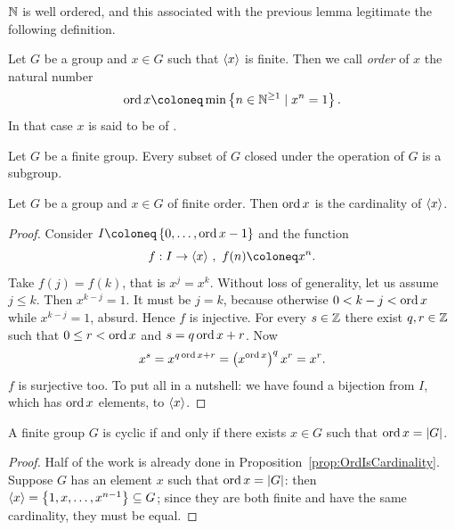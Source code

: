 \(\mathbb N\) is well ordered, and this associated with the previous lemma legitimate the following definition.

\begin{definition}
Let \(G\) be a group and \(x \in G\) such that \(\left\langle x\right\rangle\) is finite. Then we call {\em order} of \(x\) the natural number
\[\ord x \coloneq \min \set{n \in \nn^{\ge 1} \mid x^n = 1}.\]
In that case \(x\) is said to be of .
\end{definition}

\begin{exercise}
Let \(G\) be a finite group. Every subset of \(G\) closed under the operation of \(G\) is a subgroup.
\end{exercise}

\begin{proposition}\label{prop:OrdIsCardinality}
Let \(G\) be a group and \(x \in G\) of finite order. Then \(\operatorname{ord} x\) is the cardinality of \(\left\langle x\right\rangle\).
\end{proposition}

\begin{proof}
Consider \(I \coloneq \set{0, \dots{}, \ord x-1}\) and the function
\[f : I \to \gen x\,, \ f(n) \coloneq x^n.\]
Take \(f(j) = f(k)\), that is \(x^j = x^k\). Without loss of generality, let us assume \(j \le k\). Then \(x^{k-j} = 1\). It must be \(j = k\), because otherwise \(0 < k-j < \operatorname{ord} x\) while \(x^{k-j} = 1\), absurd. Hence \(f\) is injective.\newline
For every \(s \in \mathbb Z\) there exist \(q, r \in \mathbb Z\) such that \(0 \le r < \operatorname{ord} x\) and \(s = q \operatorname{ord} x +r\). Now
\[x^s = x^{q \operatorname{ord} x +r} = \left(x^{\operatorname{ord} x}\right)^q x^r = x^r.\]
\(f\) is surjective too.\newline
To put all in a nutshell: we have found a bijection from \(I\), which has \(\operatorname{ord} x\) elements, to \(\left\langle x\right\rangle\).
\end{proof}

\begin{proposition}\label{prop:CyclicIffOrdIsCard}
A finite group \(G\) is cyclic if and only if there exists \(x \in G\) such that \(\operatorname{ord} x = \lvert G \rvert\).
\end{proposition}

\begin{proof}
Half of the work is already done in Proposition~\ref{prop:OrdIsCardinality}. Suppose \(G\) has an element \(x\) such that \(\operatorname{ord} x = \lvert G \rvert\): then \(\left\langle x\right\rangle = \left\{1, x, \dots{}, x^{n-1}\right\} \subseteq G\); since they are both finite and have the same cardinality, they must be equal.
\end{proof}

